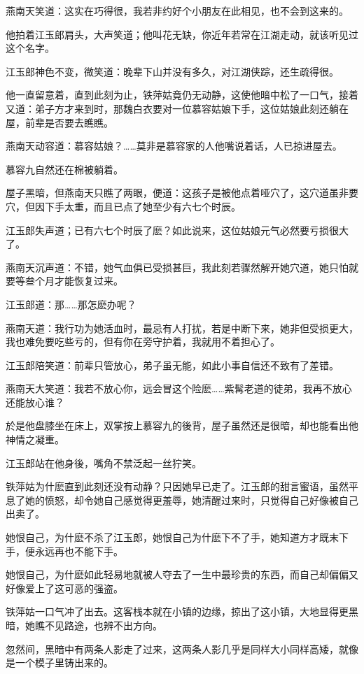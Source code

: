\documentclass[12pt,oneside]{book}
\begin{document}
燕南天笑道：这实在巧得很，我若非约好个小朋友在此相见，也不会到这来的。

他拍着江玉郎肩头，大声笑道；他叫花无缺，你近年若常在江湖走动，就该听见过这个名字。

江玉郎神色不变，微笑道：晚辈下山并没有多久，对江湖侠踪，还生疏得很。

他一直留意着，直到此刻为止，铁萍姑竟仍无动静，这使他暗中松了一口气，接着又道：弟子方才来到时，那魏白衣要对一位慕容姑娘下手，这位姑娘此刻还躺在屋，前辈是否要去瞧瞧。

燕南天动容道：慕容姑娘？\ldots\ldots 莫非是慕容家的人他嘴说着话，人已掠进屋去。

慕容九自然还在棉被躺着。

屋子黑暗，但燕南天只瞧了两眼，便道：这孩子是被他点着哑穴了，这穴道虽非要穴，但因下手太重，而且已点了她至少有六七个时辰。

江玉郎失声道；已有六七个时辰了麽？如此说来，这位姑娘元气必然要亏损很大了。

燕南天沉声道：不错，她气血俱已受损甚巨，我此刻若骤然解开她穴道，她只怕就要等叁个月才能恢复过来。

江玉郎道：那\ldots\ldots 那怎麽办呢？

燕南天道：我行功为她活血时，最忌有人打扰，若是中断下来，她非但受损更大，我也难免要吃些亏的，但有你在旁守护着，我就用不着担心了。

江玉郎陪笑道：前辈只管放心，弟子虽无能，如此小事自信还不致有了差错。

燕南天大笑道：我若不放心你，远会冒这个险麽\ldots\ldots 紫髯老道的徒弟，我再不放心还能放心谁？

於是他盘膝坐在床上，双掌按上慕容九的後背，屋子虽然还是很暗，却也能看出他神情之凝重。

江玉郎站在他身後，嘴角不禁泛起一丝狞笑。

铁萍姑为什麽直到此刻还没有动静？只因她早已走了。江玉郎的甜言蜜语，虽然平息了她的愤怒，却令她自己感觉得更羞辱，她清醒过来时，只觉得自己好像被自己出卖了。

她恨自己，为什麽不杀了江玉郎，她恨自己为什麽下不了手，她知道方才既末下手，便永远再也不能下手。

她恨自己，为什麽如此轻易地就被人夺去了一生中最珍贵的东西，而自己却偏偏又好像爱上了这可恶的强盗。

铁萍姑一口气冲了出去。这客栈本就在小镇的边缘，掠出了这小镇，大地显得更黑暗，她瞧不见路途，也辨不出方向。

忽然间，黑暗中有两条人影走了过来，这两条人影几乎是同样大小同样高矮，就像是一个模子里铸出来的。
\end{document}
